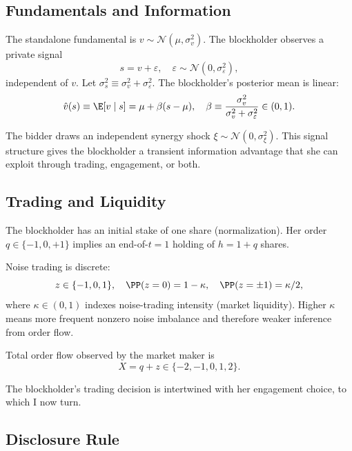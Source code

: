 \subsection{Fundamentals and Information}

The standalone fundamental is $v \sim \mathcal{N}(\mu, \sigma_v^2)$. The blockholder observes a private signal
\[
s = v + \varepsilon, \quad \varepsilon \sim \mathcal{N}(0, \sigma_\varepsilon^2),
\]
independent of $v$. Let $\sigma_s^2 \equiv \sigma_v^2 + \sigma_\varepsilon^2$. The blockholder's posterior mean is linear:
\[
\hat{v}(s) \equiv \E[v \mid s] = \mu + \beta(s - \mu), \quad \beta \equiv \frac{\sigma_v^2}{\sigma_v^2 + \sigma_\varepsilon^2} \in (0,1).
\]

The bidder draws an independent synergy shock $\xi \sim \mathcal{N}(0, \sigma_\xi^2)$. This signal structure gives the blockholder a transient information advantage that she can exploit through trading, engagement, or both.

\subsection{Trading and Liquidity}

The blockholder has an initial stake of one share (normalization). Her order $q \in \{-1, 0, +1\}$ implies an end-of-$t=1$ holding of $h = 1 + q$ shares.

Noise trading is discrete:
\[
z \in \{-1, 0, 1\}, \quad \PP(z = 0) = 1 - \kappa, \quad \PP(z = \pm 1) = \kappa/2,
\]
where $\kappa \in (0, 1)$ indexes noise-trading intensity (market liquidity). Higher $\kappa$ means more frequent nonzero noise imbalance and therefore weaker inference from order flow.

Total order flow observed by the market maker is
\[
X = q + z \in \{-2, -1, 0, 1, 2\}.
\]

The blockholder's trading decision is intertwined with her engagement choice, to which I now turn.

\subsection{Disclosure Rule}

